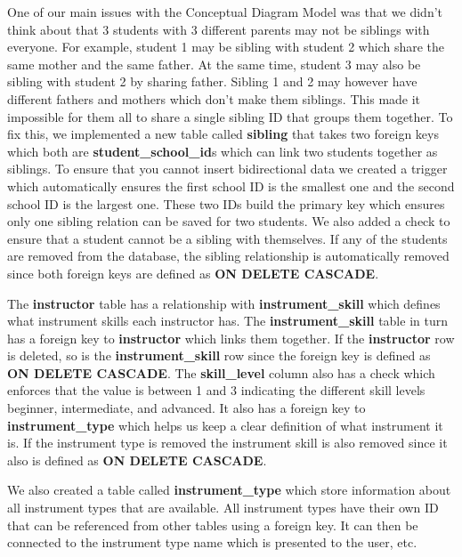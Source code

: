 \documentclass[a4paper]{scrartcl}
\begin{document}
One of our main issues with the Conceptual Diagram Model was that we didn't think about that 3 students with 3 different parents may not be siblings with everyone. For example, student 1 may be sibling with student 2 which share the same mother and the same father. At the same time, student 3 may also be sibling with student 2 by sharing father. Sibling 1 and 2 may however have different fathers and mothers which don't make them siblings. This made it impossible for them all to share a single sibling ID that groups them together. To fix this, we implemented a new table called \textbf{sibling} that takes two foreign keys which both are \textbf{student\_school\_id}s which can link two students together as siblings. To ensure that you cannot insert bidirectional data we created a trigger which automatically ensures the first school ID is the smallest one and the second school ID is the largest one. These two IDs build the primary key which ensures only one sibling relation can be saved for two students. We also added a check to ensure that a student cannot be a sibling with themselves. If any of the students are removed from the database, the sibling relationship is automatically removed since both foreign keys are defined as \textbf{ON DELETE CASCADE}.

The \textbf{instructor} table has a relationship with \textbf{instrument\_skill} which defines what instrument skills each instructor has. The \textbf{instrument\_skill} table in turn has a foreign key to \textbf{instructor} which links them together. If the \textbf{instructor} row is deleted, so is the \textbf{instrument\_skill} row since the foreign key is defined as \textbf{ON DELETE CASCADE}. The \textbf{skill\_level} column also has a check which enforces that the value is between 1 and 3 indicating the different skill levels beginner, intermediate, and advanced. It also has a foreign key to \textbf{instrument\_type} which helps us keep a clear definition of what instrument it is. If the instrument type is removed the instrument skill is also removed since it also is defined as \textbf{ON DELETE CASCADE}.

We also created a table called \textbf{instrument\_type} which store information about all instrument types that are available. All instrument types have their own ID that can be referenced from other tables using a foreign key. It can then be connected to the instrument type name which is presented to the user, etc.
\end{document}
